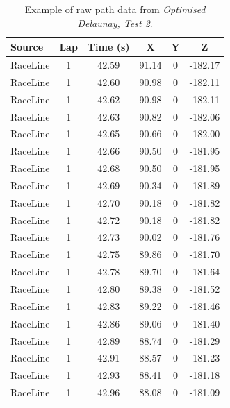 \documentclass[a4paper,11pt]{report}
\begin{document}
\begin{table}[H]
    \centering
    \scriptsize
    \begin{tabular}{|l|c|c|c|c|c|}
    \hline
    \textbf{Source} & \textbf{Lap} & \textbf{Time (s)} & \textbf{X} & \textbf{Y} & \textbf{Z} \\
    \hline
    RaceLine & 1 & 42.59 & 91.14 & 0 & -182.17 \\
    RaceLine & 1 & 42.60 & 90.98 & 0 & -182.11 \\
    RaceLine & 1 & 42.62 & 90.98 & 0 & -182.11 \\
    RaceLine & 1 & 42.63 & 90.82 & 0 & -182.06 \\
    RaceLine & 1 & 42.65 & 90.66 & 0 & -182.00 \\
    RaceLine & 1 & 42.66 & 90.50 & 0 & -181.95 \\
    RaceLine & 1 & 42.68 & 90.50 & 0 & -181.95 \\
    RaceLine & 1 & 42.69 & 90.34 & 0 & -181.89 \\
    RaceLine & 1 & 42.70 & 90.18 & 0 & -181.82 \\
    RaceLine & 1 & 42.72 & 90.18 & 0 & -181.82 \\
    RaceLine & 1 & 42.73 & 90.02 & 0 & -181.76 \\
    RaceLine & 1 & 42.75 & 89.86 & 0 & -181.70 \\
    RaceLine & 1 & 42.78 & 89.70 & 0 & -181.64 \\
    RaceLine & 1 & 42.80 & 89.38 & 0 & -181.52 \\
    RaceLine & 1 & 42.83 & 89.22 & 0 & -181.46 \\
    RaceLine & 1 & 42.86 & 89.06 & 0 & -181.40 \\
    RaceLine & 1 & 42.89 & 88.74 & 0 & -181.29 \\
    RaceLine & 1 & 42.91 & 88.57 & 0 & -181.23 \\
    RaceLine & 1 & 42.93 & 88.41 & 0 & -181.18 \\
    RaceLine & 1 & 42.96 & 88.08 & 0 & -181.09 \\
    \hline
    \end{tabular}
    \caption{Example of raw path data from \textit{Optimised Delaunay, Test 2}.}
    \label{tab:rawdata_example_full}
    \end{table}
\end{document}
